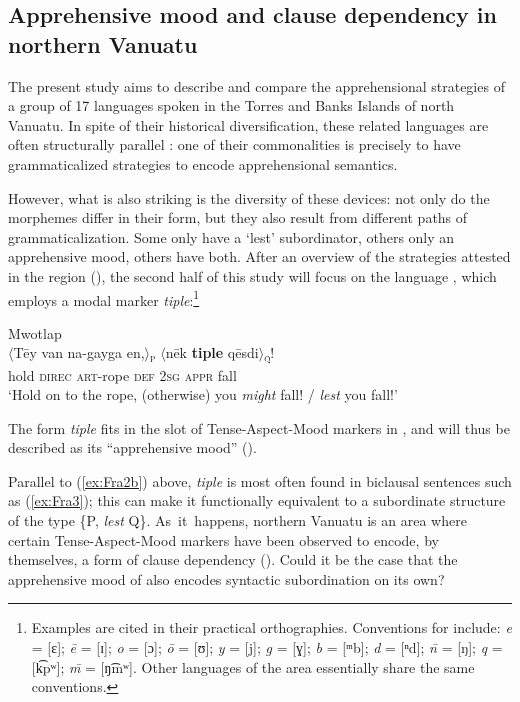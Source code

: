 \documentclass[output=paper,colorlinks,citecolor=brown]{langscibook}
\begin{document}
\subsection{Apprehensive mood and clause dependency in northern Vanuatu}
\label{subsec:moodandclause}

 
The present study aims to describe and compare the apprehensional strategies of a group of 17  languages spoken in the Torres and Banks Islands of north Vanuatu. In spite of their historical diversification, these related languages are often structurally parallel \citep{François2011}: one of their commonalities is precisely to have grammaticalized strategies to encode apprehensional semantics.

However, what is also striking is the diversity of these devices: not only do the morphemes differ in their form, but they also result from different paths of grammaticalization. Some only have a ‘lest’ subordinator, others only an apprehensive mood, others have both. After an overview of the strategies attested in the region (), the second half of this study will focus on the language , which employs a modal marker \textit{tiple}:\footnote{Examples are cited in their practical orthographies. Conventions for  include:  \textit{e} = [{ɛ}]; \textit{ē} = [{ɪ}]; \textit{o} = [{ɔ}]; \textit{ō} = [{ʊ}]; \textit{y} = [{j}]; \textit{g} = [{ɣ}]; \textit{b} = [{ᵐb}]; \textit{d} = [{ⁿd}]; \textit{\={n}} = [{ŋ}]; \textit{q} = [{k͡pʷ}]; \textit{\={m}} = [{ŋ͡mʷ}]. Other languages of the area essentially share the same conventions.}
 
\ea \label{ex:Fra3} \textnormal{Mwotlap}\\
\gll ${\langle}$Tēy van na-gayga en,${\rangle}$\textnormal{\textsc{\textsubscript{p}}} ${\langle}$nēk \textbf{tiple} qēsdi${\rangle}$\textnormal{\textsc{\textsubscript{q}}}! \\
hold \textsc{direc} \textsc{art}-rope \textsc{def} \textsc{2sg} \textsc{appr} fall \\
\glt `Hold on to the rope, (otherwise) you \textit{might} fall! / \textit{lest} you fall!'
\z
 
\noindent The form \textit{tiple} fits in the slot of Tense-Aspect-Mood markers in , and will thus be described as its ``apprehensive mood'' (\citealt[130]{François2005a}).

Parallel to (\ref{ex:Fra2b}) above,  \textit{tiple} is most often found in biclausal sentences such as (\ref{ex:Fra3}); this can make it functionally equivalent to a subordinate structure of the type \{P, \textit{lest} Q\}. As~it~happens, northern Vanuatu is an area where certain Tense-Aspect-Mood markers have been observed to encode, by themselves, a form of clause dependency (). Could it be the case that the apprehensive mood of  also encodes syntactic subordination on its own?
\end{document}
